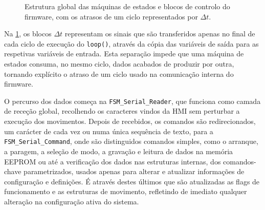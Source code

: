 \begin{figure}[p]
{}
  \caption{Estrutura global das máquinas de estados e blocos de controlo do firmware, com os atrasos de um ciclo representados por \(\Delta t\).}
  \label{fig:arquitetura-software}
\end{figure}
\clearpage

Na \cref{fig:arquitetura-software}, os blocos \(\Delta t\) representam os sinais que são transferidos apenas no final de cada ciclo de execução do \texttt{loop()}, através da cópia das variáveis de saída para as respetivas variáveis de entrada. Esta separação impede que uma máquina de estados consuma, no mesmo ciclo, dados acabados de produzir por outra, tornando explícito o atraso de um ciclo usado na comunicação interna do firmware.

O percurso dos dados começa na \texttt{FSM\_Serial\_Reader}, que funciona como camada de receção global, recolhendo os caracteres vindos da HMI sem perturbar a execução dos movimentos. Depois de recebidos, os comandos são redirecionados, um carácter de cada vez ou numa única sequência de texto, para a \texttt{FSM\_Serial\_Command}, onde são distinguidos comandos simples, como o arranque, a paragem, a seleção de modo, a gravação e leitura de dados na memória EEPROM ou até a verificação dos dados nas estruturas internas, dos comandos-chave parametrizados, usados apenas para alterar e atualizar informações de configuração e definições. É através destes últimos que são atualizadas as flags de funcionamento e as estruturas de movimento, refletindo de imediato qualquer alteração na configuração ativa do sistema.

